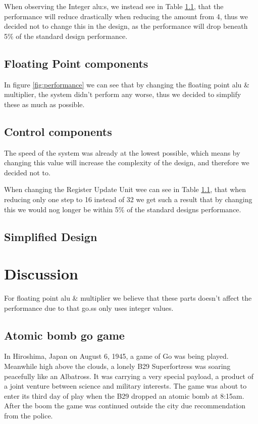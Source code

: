 \documentclass[titlepage, a4paper]{article}
\begin{document}
When observing the Integer alu:s, we instead see in Table \ref{}, that the performance will reduce drastically when reducing the amount from 4, thus we decided not to change this in the design, as the performance will drop beneath 5\% of the standard design performance.

\subsection{Floating Point components}
In figure \ref{fig:performance} we can see that by changing the floating point alu \& multiplier, the system didn't perform any worse, thus we decided to simplify these as much as possible.

\subsection{Control components}
The speed of the system was already at the lowest possible, which means by changing this value will increase the complexity of the design, and therefore we decided not to.

When changing the Register Update Unit wee can see in Table \ref{}, that when reducing only one step to 16 instead of 32 we get such a result that by changing this we would nog longer be within 5\% of the standard designs performance.

\subsection{Simplified Design}


\section{Discussion}
For floating point alu \& multiplier we believe that these parts doesn't affect the performance due to that go.ss only uses integer values.

\subsection{Atomic bomb go game}
In Hiroshima, Japan on August 6, 1945, a game of Go was being played. Meanwhile high above the clouds, a lonely B29 Superfortress was soaring peacefully like an Albatross. It was carrying a very special payload, a product of a joint venture between science and military interests. The game was about to enter its third day of play when the B29 dropped an atomic bomb at 8:15am. After the boom the game was continued outside the city due recommendation from the police.
\end{document}
